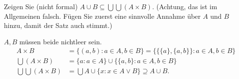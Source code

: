 
\begin{exercise}[265]

Zeigen Sie (nicht formal) $A \cup B \subseteq \bigcup \bigcup (A \times B)$.
(Achtung, das ist im Allgemeinen falsch. Fügen Sie zuerst eine sinnvolle Annahme
über $A$ und $B$ hinzu, damit der Satz auch stimmt.)

\end{exercise}


\begin{solution}
$A,B$ müssen beide nichtleer sein.
\begin{align*}
  A \times B &= \{(a,b): a \in A, b \in B\} = \{\{\{a\},\{a,b\}\}: a \in A, b \in B\} \\
  \bigcup (A \times B) &= \{ a: a \in A\} \cup \{\{a,b\}: a \in A, b \in B\}\\
  \bigcup \bigcup (A \times B) &= \bigcup A \cup \{ x: x \in A \lor B\}
  \supseteq A \cup B.
\end{align*}

\end{solution}
